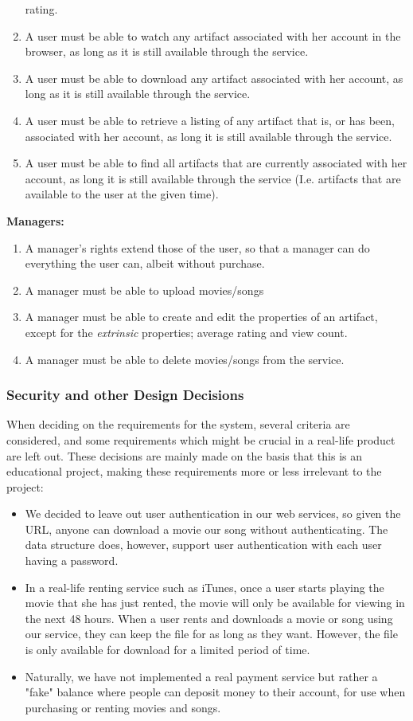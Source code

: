 \begin{enumerate}
	rating.
\item A user must be able to watch any artifact associated with her account
	in the browser, as long as it is still available through the service.
\item A user must be able to download any artifact associated with her account,
	as long as it is still available through the service.
\item A user must be able to retrieve a listing of any artifact that is, or has
	been, associated with her account, as long it is still available through
	the service.
\item A user must be able to find all artifacts that are currently associated
	with her account, as long it is still available through the service (I.e.
	artifacts that are available to the user at the given time).
\setcounter{enumTemp}{\theenumi}
\end{enumerate}
\textbf{Managers:}
\begin{enumerate}
\setcounter{enumi}{\theenumTemp}
\item A manager's rights extend those of the user, so that a manager can do
	everything the user can, albeit without purchase.
\item A manager must be able to upload movies/songs
\item A manager must be able to create and edit the properties of an artifact,
	except for the \emph{extrinsic} properties; average rating and view
	count.
\item A manager must be able to delete movies/songs from the service.
\end{enumerate}

\subsubsection{Security and other Design Decisions} When deciding on the
requirements for the system, several criteria are considered, and some
requirements which might be crucial in a real-life product are left out. These
decisions are mainly made on the basis that this is an educational project,
making these requirements more or less irrelevant to the project:
\begin{itemize}
\item We decided to leave out user authentication in our web services, so given
	the URL, anyone can download a movie our song without authenticating.
	The data structure does, however, support user authentication with each
	user having a password.
\item In a real-life renting service such as iTunes, once a user starts playing
	the movie that she has just rented, the movie will only be available
	for viewing in the next 48 hours. When a user rents and downloads a
	movie or song using our service, they can keep the file for as long as
	they want. However, the file is only available for download for a
	limited period of time.
\item Naturally, we have not implemented a real payment service but rather a
	"fake" balance where people can deposit money to their account, for use
	when purchasing or renting movies and songs.
\end{itemize}
